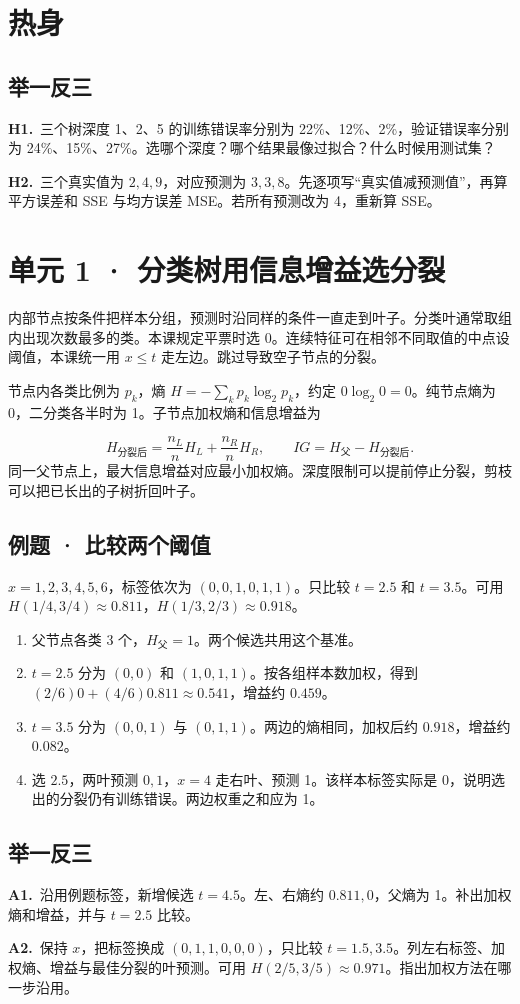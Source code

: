\documentclass[UTF8,a4paper,11pt]{ctexart}
\newcommand{\PracticeQuestion}[3]{\par\Needspace{4\baselineskip}\noindent\begin{minipage}{\linewidth}\textbf{#1.}\ #2\par\noindent\rule{0pt}{#3mm}\par\end{minipage}\par}
\begin{document}
\section{热身}
\subsection{举一反三}
\PracticeQuestion{H1}{三个树深度 1、2、5 的训练错误率分别为 22\%、12\%、2\%，验证错误率分别为 24\%、15\%、27\%。选哪个深度？哪个结果最像过拟合？什么时候用测试集？}{35}
\PracticeQuestion{H2}{三个真实值为 $2,4,9$，对应预测为 $3,3,8$。先逐项写“真实值减预测值”，再算平方误差和 SSE 与均方误差 MSE。若所有预测改为 4，重新算 SSE。}{35}
\clearpage
\section{单元 1 · 分类树用信息增益选分裂}
内部节点按条件把样本分组，预测时沿同样的条件一直走到叶子。分类叶通常取组内出现次数最多的类。本课规定平票时选 0。连续特征可在相邻不同取值的中点设阈值，本课统一用 $x\le t$ 走左边。跳过导致空子节点的分裂。

节点内各类比例为 $p_k$，熵 $H=-\sum_k p_k\log_2 p_k$，约定 $0\log_2 0=0$。纯节点熵为 0，二分类各半时为 1。子节点加权熵和信息增益为

\[H_{\text{分裂后}}=\frac{n_L}{n}H_L+\frac{n_R}{n}H_R,\qquad IG=H_{\text{父}}-H_{\text{分裂后}}.\]
同一父节点上，最大信息增益对应最小加权熵。深度限制可以提前停止分裂，剪枝可以把已长出的子树折回叶子。

\subsection{例题 · 比较两个阈值}
$x=1,2,3,4,5,6$，标签依次为 $(0,0,1,0,1,1)$。只比较 $t=2.5$ 和 $t=3.5$。可用 $H(1/4,3/4)\approx0.811$，$H(1/3,2/3)\approx0.918$。

\begin{enumerate}
\item 父节点各类 3 个，$H_{\text{父}}=1$。两个候选共用这个基准。
\item $t=2.5$ 分为 $(0,0)$ 和 $(1,0,1,1)$。按各组样本数加权，得到 $(2/6)0+(4/6)0.811\approx0.541$，增益约 $0.459$。
\item $t=3.5$ 分为 $(0,0,1)$ 与 $(0,1,1)$。两边的熵相同，加权后约 $0.918$，增益约 $0.082$。
\item 选 $2.5$，两叶预测 $0,1$，$x=4$ 走右叶、预测 1。该样本标签实际是 0，说明选出的分裂仍有训练错误。两边权重之和应为 1。
\end{enumerate}
\subsection{举一反三}
\PracticeQuestion{A1}{沿用例题标签，新增候选 $t=4.5$。左、右熵约 $0.811,0$，父熵为 1。补出加权熵和增益，并与 $t=2.5$ 比较。}{23}
\PracticeQuestion{A2}{保持 $x$，把标签换成 $(0,1,1,0,0,0)$，只比较 $t=1.5,3.5$。列左右标签、加权熵、增益与最佳分裂的叶预测。可用 $H(2/5,3/5)\approx0.971$。指出加权方法在哪一步沿用。}{34}
\clearpage
\end{document}
